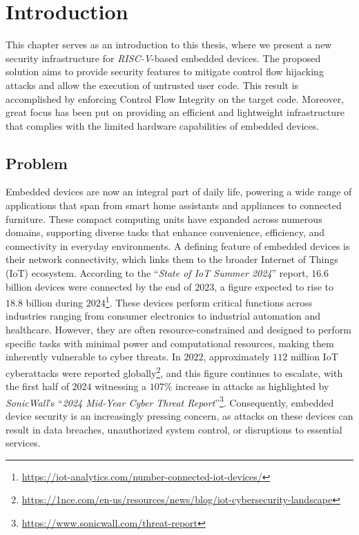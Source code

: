 \chapter{Introduction}
\label{cha:introduction}

This chapter serves as an introduction to this thesis, where we present a new security
infrastructure for \textit{RISC-V}-based embedded devices. The proposed solution
aims to provide security features to mitigate control flow hijacking attacks and
allow the execution of untrusted user code. This result is accomplished by
enforcing Control Flow Integrity on the target code. Moreover, great focus has
been put on providing an efficient and lightweight infrastructure that complies
with the limited hardware capabilities of embedded devices.

\section{Problem}
\label{sec:intro_context}

Embedded devices are now an integral part of daily life, powering a wide range
of applications that span from smart home assistants and appliances to connected
furniture. These compact computing units have expanded across numerous domains,
supporting diverse tasks that enhance convenience, efficiency, and connectivity
in everyday environments. A defining feature of embedded devices is their network
connectivity, which links them to the broader Internet of Things (IoT) ecosystem.
According to the ``\textit{State of IoT Summer 2024}'' report, $16.6$ billion devices
were connected by the end of $2023$, a figure expected to rise to $18.8$ billion
during $2024$\footnote{\url{https://iot-analytics.com/number-connected-iot-devices/}}.
These devices perform critical functions across industries ranging from consumer
electronics to industrial automation and healthcare. However, they are often
resource-constrained and designed to perform specific tasks with minimal power
and computational resources, making them inherently vulnerable to cyber threats.
In $2022$, approximately $112$ million IoT cyberattacks were reported globally\footnote{\url{https://1nce.com/en-us/resources/news/blog/iot-cybersecurity-landscape}},
and this figure continues to escalate, with the first half of $2024$ witnessing
a $107\%$ increase in attacks as highlighted by \textit{SonicWall}'s ``\textit{2024
Mid-Year Cyber Threat Report}''\footnote{\url{https://www.sonicwall.com/threat-report}}.
Consequently, embedded device security is an increasingly pressing concern, as
attacks on these devices can result in data breaches, unauthorized system control,
or disruptions to essential services.

